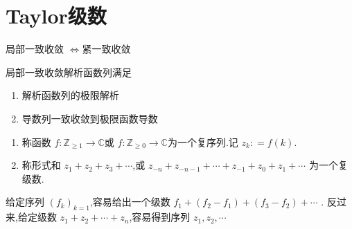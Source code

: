 \documentclass[../../复变函数.tex]{subfiles}
\begin{document}
\ifSubfilesClassLoaded{
    \frontmatter

    \tableofcontents
    
    \mainmatter
    \setcounter{chapter}{4}
}{}


\chapter{Taylor级数}

\begin{introduction}
    \item 局部一致收敛 \(  \iff   \)紧一致收敛 
    \item 局部一致收敛解析函数列满足\begin{enumerate}
        \item     解析函数列的极限解析
        \item 导数列一致收敛到极限函数导数
    \end{enumerate}
    

\end{introduction}

\begin{definition}
    \begin{enumerate}
        \item 称函数 \(  f: \mathbb{Z} _{\ge 1}\to \mathbb{C}   \)或 \(  f: \mathbb{Z} _{\ge 0}\to \mathbb{C}   \)为一个复序列.记 \(  z_{k}: =  f\left( k \right)   \).
        \item 称形式和 \(  z_1+ z_2+ z_3+ \cdots   \),或 \(  z_{-n}+ z_{-n-1}+ \cdots + z_{-1}+ z_0+ z_1+ \cdots   \)  为一个复级数.
    \end{enumerate}
       
\end{definition}

\begin{remark}
    给定序列 \(  \left( f_{k} \right)_{k= 1}   \),容易给出一个级数 \(  f_1+ \left( f_2-f_1 \right)+ \left( f_3-f_2 \right)+ \cdots     \)  .
 反过来,给定级数 \(  z_1+ z_2+ \cdots + z_{n}  \),容易得到序列 \(  z_1,z_2,\cdots   \)  
\end{remark}
\end{document}
